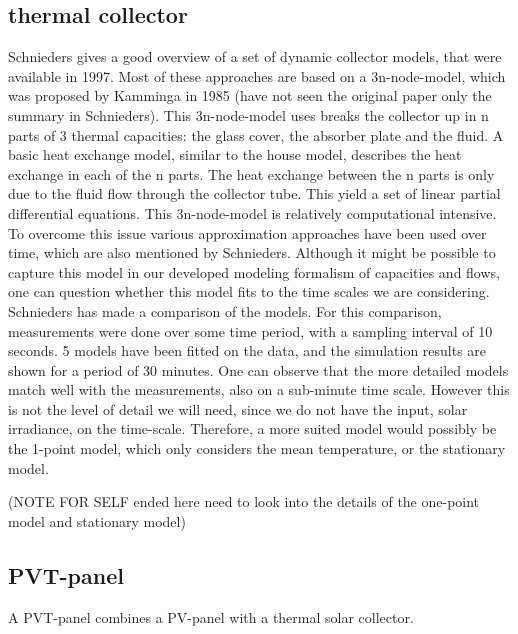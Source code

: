 \subsection{thermal collector}
Schnieders \cite{schnieders1997comparison}  gives a good overview of a set of dynamic collector models, that were available in 1997. Most of these approaches are based on a 3n-node-model, which was proposed by Kamminga in 1985 \cite{kamminga1985experiences}(have not seen the original paper only the summary in Schnieders). This 3n-node-model uses breaks the collector up in n parts of 3 thermal capacities: the glass cover, the absorber plate and the fluid. A basic heat exchange model, similar to the house model, describes the heat exchange in each of the n parts. The heat exchange between the n parts is only due to the fluid flow through the collector tube. This yield a set of linear partial differential equations. This 3n-node-model is relatively computational intensive. To overcome this issue various approximation approaches have been used over time, which are also mentioned by Schnieders. 
Although it might be possible to capture this model in our developed modeling formalism of capacities and flows, one can question whether this model fits to the time scales we are considering. Schnieders has made a comparison of the models. For this comparison, measurements were done over some time period, with a sampling interval of 10 seconds. 5 models have been fitted on the data, and the simulation results are shown for a period of 30 minutes. One can observe that the more detailed models match well with the measurements, also on a sub-minute time scale. However this is not the level of detail we will need, since we do not have the input, solar irradiance, on the time-scale. Therefore, a more suited model would possibly be the 1-point model, which only considers the mean temperature, or the stationary model.

(NOTE FOR SELF ended here need to look into the details of the one-point model and stationary model)





\subsection{PVT-panel}

A PVT-panel combines a PV-panel with a thermal solar collector. 

